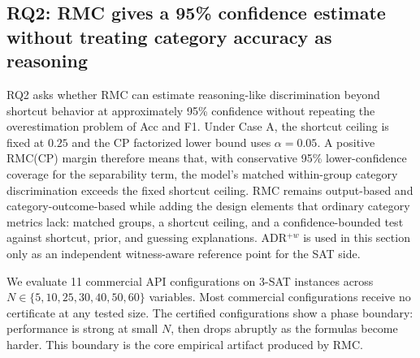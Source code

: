 \documentclass[conference]{IEEEtran}
\theoremstyle{remark}
\begin{document}
\subsection{RQ2: RMC gives a 95\% confidence estimate without treating category accuracy as reasoning}
\label{sec:rq2}

RQ2 asks whether RMC can estimate reasoning-like discrimination beyond shortcut behavior at approximately 95\% confidence without repeating the overestimation problem of Acc and F1.  Under Case A, the shortcut ceiling is fixed at $0.25$ and the CP factorized lower bound uses $\alpha=0.05$.  A positive RMC(CP) margin therefore means that, with conservative 95\% lower-confidence coverage for the separability term, the model's matched within-group category discrimination exceeds the fixed shortcut ceiling.  RMC remains output-based and category-outcome-based while adding the design elements that ordinary category metrics lack: matched groups, a shortcut ceiling, and a confidence-bounded test against shortcut, prior, and guessing explanations.  ADR$^{+w}$ is used in this section only as an independent witness-aware reference point for the SAT side.

We evaluate 11 commercial API configurations on 3-SAT instances across $N\in\{5,10,25,30,40,50,60\}$ variables.  Most commercial configurations receive no certificate at any tested size.  The certified configurations show a phase boundary: performance is strong at small $N$, then drops abruptly as the formulas become harder.  This boundary is the core empirical artifact produced by RMC.
\end{document}
